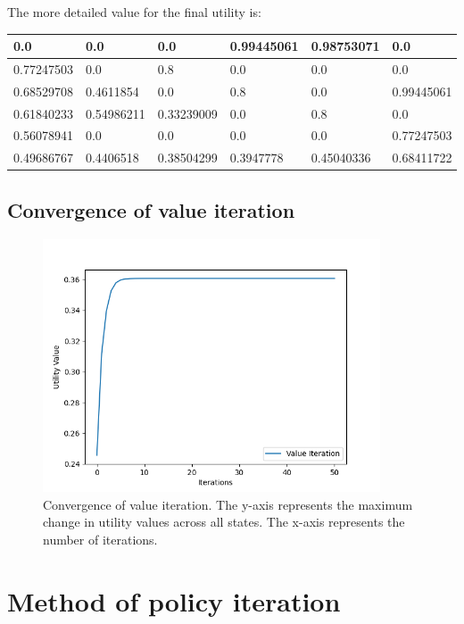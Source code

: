 \documentclass{article}
\begin{document}
The more detailed value for the final utility is:

\begin{table}[H]
    \begin{tabular}{|l|l|l|l|l|l|}
        \hline
        0.0        & 0.0        & 0.0        & 0.99445061 & 0.98753071 & 0.0        \\\hline
        0.77247503 & 0.0        & 0.8        & 0.0        & 0.0        & 0.0        \\\hline
        0.68529708 & 0.4611854  & 0.0        & 0.8        & 0.0        & 0.99445061 \\\hline
        0.61840233 & 0.54986211 & 0.33239009 & 0.0        & 0.8        & 0.0        \\\hline
        0.56078941 & 0.0        & 0.0        & 0.0        & 0.0        & 0.77247503 \\\hline
        0.49686767 & 0.4406518  & 0.38504299 & 0.3947778  & 0.45040336 & 0.68411722 \\\hline
    \end{tabular}
\end{table}

\subsection{Convergence of value iteration}

\begin{figure}[H]
    \includegraphics[width=100mm]{../asset/value_iteration_curve.png}
    \caption{Convergence of value iteration. The y-axis represents the maximum change in utility values across all states. The x-axis represents the number of iterations.}
    \label{fig:value_iteration_convergence}
\end{figure}

\section{Method of policy iteration}
\end{document}
